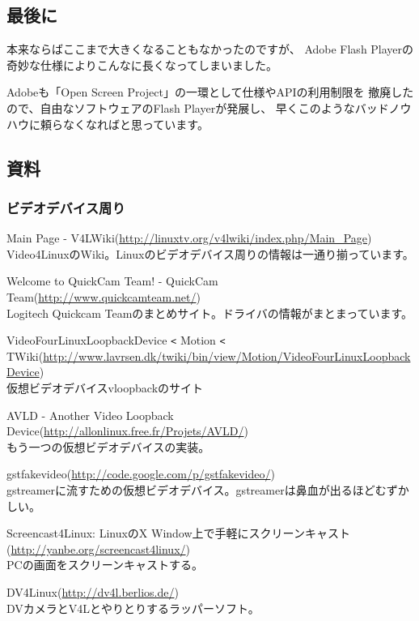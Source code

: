 \documentclass[mingoth,a4paper]{jsarticle}
\begin{document}
\subsection{最後に}

本来ならばここまで大きくなることもなかったのですが、
Adobe Flash Playerの奇妙な仕様によりこんなに長くなってしまいました。

Adobeも「Open Screen Project」の一環として仕様やAPIの利用制限を
撤廃したので、自由なソフトウェアのFlash Playerが発展し、
早くこのようなバッドノウハウに頼らなくなればと思っています。

\subsection{資料}

\subsubsection{ビデオデバイス周り}

Main Page - V4LWiki(\url{http://linuxtv.org/v4lwiki/index.php/Main_Page})\\
Video4LinuxのWiki。Linuxのビデオデバイス周りの情報は一通り揃っています。

Welcome to QuickCam Team! - QuickCam Team(\url{http://www.quickcamteam.net/})\\
Logitech Quickcam Teamのまとめサイト。ドライバの情報がまとまっています。

VideoFourLinuxLoopbackDevice \verb|<| Motion \verb|<| TWiki(\url{http://www.lavrsen.dk/twiki/bin/view/Motion/VideoFourLinuxLoopbackDevice})\\
仮想ビデオデバイスvloopbackのサイト

AVLD - Another Video Loopback Device(\url{http://allonlinux.free.fr/Projets/AVLD/})\\
もう一つの仮想ビデオデバイスの実装。

gstfakevideo(\url{http://code.google.com/p/gstfakevideo/})\\
gstreamerに流すための仮想ビデオデバイス。gstreamerは鼻血が出るほどむずか
しい。

Screencast4Linux: LinuxのX Window上で手軽にスクリーンキャスト
(\url{http://yanbe.org/screencast4linux/})\\
PCの画面をスクリーンキャストする。

DV4Linux(\url{http://dv4l.berlios.de/})\\
DVカメラとV4Lとやりとりするラッパーソフト。
\end{document}
